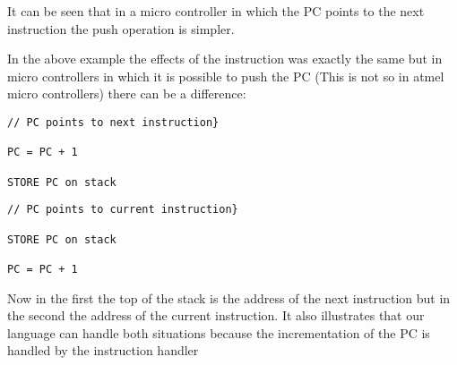 It can be seen that in a micro controller in which the PC points to the
next instruction the push operation is simpler.

In the above example the effects of the instruction was exactly the same
but in micro controllers in which it is possible to push the PC (This
is not so in atmel micro controllers) there can be a difference:

\begin{verbatim}
// PC points to next instruction}

PC = PC + 1

STORE PC on stack
\end{verbatim}

\begin{verbatim}
// PC points to current instruction}

STORE PC on stack

PC = PC + 1
\end{verbatim}

Now in the first the top of the stack is the address of the next
instruction but in the second the address of the current instruction.
It also illustrates that our language can handle both situations
because the incrementation of the PC is handled by the instruction
handler

